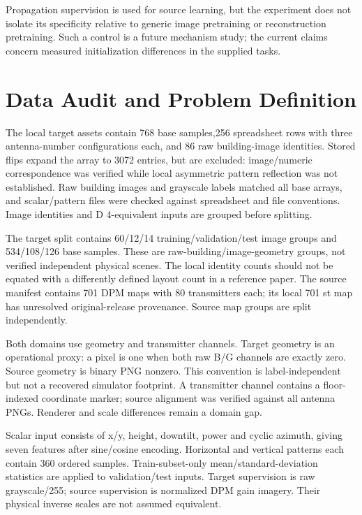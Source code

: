 \documentclass[conference]{IEEEtran}
\begin{document}
Propagation supervision is used for source learning, but the experiment does not isolate its specificity relative to generic image pretraining or reconstruction pretraining. Such a control is a future mechanism study; the current claims concern measured initialization differences in the supplied tasks.

\section{Data Audit and Problem Definition}
The local target assets contain 768 base samples,256 spreadsheet rows with three antenna-number configurations each, and 86 raw building-image identities. Stored flips expand the array to 3072 entries, but are excluded: image/numeric correspondence was verified while local asymmetric pattern reflection was not established. Raw building images and grayscale labels matched all base arrays, and scalar/pattern files were checked against spreadsheet and file conventions. Image identities and D 4-equivalent inputs are grouped before splitting.

The target split contains 60/12/14 training/validation/test image groups and 534/108/126 base samples. These are raw-building/image-geometry groups, not verified independent physical scenes. The local identity counts should not be equated with a differently defined layout count in a reference paper. The source manifest contains 701 DPM maps with 80 transmitters each; its local 701 st map has unresolved original-release provenance. Source map groups are split independently.

Both domains use geometry and transmitter channels. Target geometry is an operational proxy: a pixel is one when both raw B/G channels are exactly zero. Source geometry is binary PNG nonzero. This convention is label-independent but not a recovered simulator footprint. A transmitter channel contains a floor-indexed coordinate marker; source alignment was verified against all antenna PNGs. Renderer and scale differences remain a domain gap.

Scalar input consists of x/y, height, downtilt, power and cyclic azimuth, giving seven features after sine/cosine encoding. Horizontal and vertical patterns each contain 360 ordered samples. Train-subset-only mean/standard-deviation statistics are applied to validation/test inputs. Target supervision is raw grayscale/255; source supervision is normalized DPM gain imagery. Their physical inverse scales are not assumed equivalent.
\end{document}

